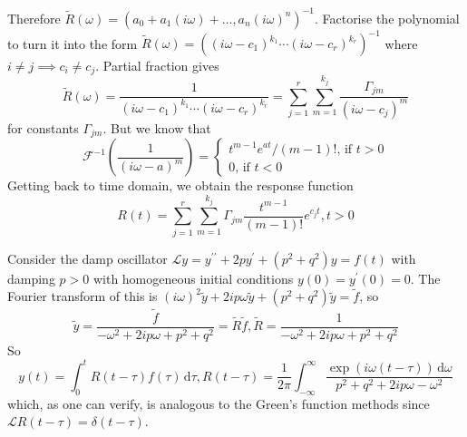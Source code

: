 Therefore $\tilde{R}(\omega)=(a_0+a_1(i\omega)+\ldots,a_n(i\omega)^n)^{-1}$.
Factorise the polynomial to turn it into the form $\tilde{R}(\omega)=((i\omega-c_1)^{k_1}\cdots (i\omega-c_r)^{k_r})^{-1}$ where $i\neq j\implies c_i\neq c_j$.
Partial fraction gives
$$\tilde{R}(\omega)=\frac{1}{(i\omega-c_1)^{k_1}\cdots (i\omega-c_r)^{k_r}}=\sum_{j=1}^r\sum_{m=1}^{k_j}\frac{\Gamma_{jm}}{(i\omega-c_j)^m}$$
for constants $\Gamma_{jm}$.
But we know that
$$\mathcal F^{-1}\left( \frac{1}{(i\omega-a)^m} \right)=\begin{cases}
    t^{m-1}e^{at}/(m-1)!\text{, if $t>0$}\\
    0\text{, if $t<0$}
\end{cases}$$
Getting back to time domain, we obtain the response function
$$R(t)=\sum_{j=1}^r\sum_{m=1}^{k_j}\Gamma_{jm}\frac{t^{m-1}}{(m-1)!}e^{c_jt},t>0$$
\begin{example}
    Consider the damp oscillator $\mathcal Ly=y^{\prime\prime}+2py^\prime+(p^2+q^2)y=f(t)$ with damping $p>0$ with homogeneous initial conditions $y(0)=y^\prime(0)=0$.
    The Fourier transform of this is $(i\omega)^2\tilde{y}+2ip\omega\tilde{y}+(p^2+q^2)\tilde{y}=\tilde{f}$, so
    $$\tilde{y}=\frac{\tilde{f}}{-\omega^2+2ip\omega+p^2+q^2}=\tilde{R}\tilde{f},\tilde{R}=\frac{1}{-\omega^2+2ip\omega+p^2+q^2}$$
    So
    $$y(t)=\int_0^tR(t-\tau)f(\tau)\,\mathrm d\tau,R(t-\tau)=\frac{1}{2\pi}\int_{-\infty}^\infty\frac{\exp(i\omega(t-\tau))\,\mathrm d\omega}{p^2+q^2+2ip\omega-\omega^2}$$
    which, as one can verify, is analogous to the Green's function methods since $\mathcal LR(t-\tau)=\delta(t-\tau)$.
\end{example}
